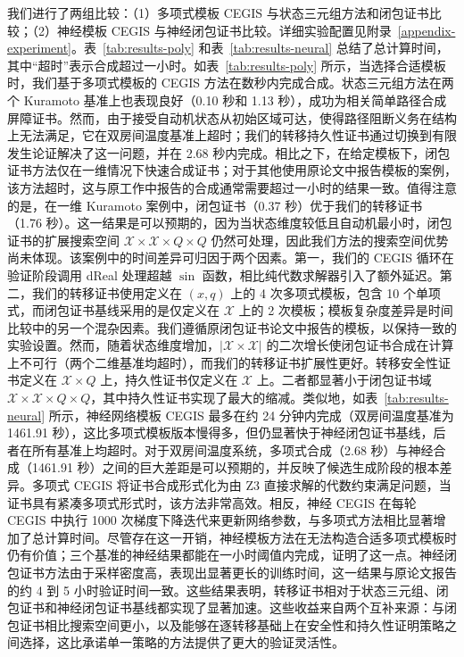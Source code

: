我们进行了两组比较：（1）多项式模板 CEGIS 与状态三元组方法和闭包证书比较；（2）神经模板 CEGIS 与神经闭包证书比较。详细实验配置见附录~\ref{appendix-experiment}。表~\ref{tab:results-poly} 和表~\ref{tab:results-neural} 总结了总计算时间，其中“超时”表示合成超过一小时。如表~\ref{tab:results-poly} 所示，当选择合适模板时，我们基于多项式模板的 CEGIS 方法在数秒内完成合成。状态三元组方法在两个 Kuramoto 基准上也表现良好（0.10 秒和 1.13 秒），成功为相关简单路径合成屏障证书。然而，由于接受自动机状态从初始区域可达，使得路径阻断义务在结构上无法满足，它在双房间温度基准上超时；我们的转移持久性证书通过切换到有限发生论证解决了这一问题，并在 2.68 秒内完成。相比之下，在给定模板下，闭包证书方法仅在一维情况下快速合成证书；对于其他使用原论文中报告模板的案例，该方法超时，这与原工作中报告的合成通常需要超过一小时的结果一致。值得注意的是，在一维 Kuramoto 案例中，闭包证书（0.37 秒）优于我们的转移证书（1.76 秒）。这一结果是可以预期的，因为当状态维度较低且自动机最小时，闭包证书的扩展搜索空间 $\mathcal{X} \times \mathcal{X} \times Q \times Q$ 仍然可处理，因此我们方法的搜索空间优势尚未体现。该案例中的时间差异可归因于两个因素。第一，我们的 CEGIS 循环在验证阶段调用 dReal 处理超越 $\sin$ 函数，相比纯代数求解器引入了额外延迟。第二，我们的转移证书使用定义在 $(x, q)$ 上的 4 次多项式模板，包含 10 个单项式，而闭包证书基线采用的是仅定义在 $\mathcal{X}$ 上的 2 次模板；模板复杂度差异是时间比较中的另一个混杂因素。我们遵循原闭包证书论文中报告的模板，以保持一致的实验设置。然而，随着状态维度增加，$|\mathcal{X} \times \mathcal{X}|$ 的二次增长使闭包证书合成在计算上不可行（两个二维基准均超时），而我们的转移证书扩展性更好。转移安全性证书定义在 $\mathcal{X} \times Q$ 上，持久性证书仅定义在 $\mathcal{X}$ 上。二者都显著小于闭包证书域 $\mathcal{X} \times \mathcal{X} \times Q \times Q$，其中持久性证书实现了最大的缩减。类似地，如表~\ref{tab:results-neural} 所示，神经网络模板 CEGIS 最多在约 24 分钟内完成（双房间温度基准为 1461.91 秒），这比多项式模板版本慢得多，但仍显著快于神经闭包证书基线，后者在所有基准上均超时。对于双房间温度系统，多项式合成（2.68 秒）与神经合成（1461.91 秒）之间的巨大差距是可以预期的，并反映了候选生成阶段的根本差异。多项式 CEGIS 将证书合成形式化为由 Z3 直接求解的代数约束满足问题，当证书具有紧凑多项式形式时，该方法非常高效。相反，神经 CEGIS 在每轮 CEGIS 中执行 1000 次梯度下降迭代来更新网络参数，与多项式方法相比显著增加了总计算时间。尽管存在这一开销，神经模板方法在无法构造合适多项式模板时仍有价值；三个基准的神经结果都能在一小时阈值内完成，证明了这一点。神经闭包证书方法由于采样密度高，表现出显著更长的训练时间，这一结果与原论文报告的约 4 到 5 小时验证时间一致。这些结果表明，转移证书相对于状态三元组、闭包证书和神经闭包证书基线都实现了显著加速。这些收益来自两个互补来源：与闭包证书相比搜索空间更小，以及能够在逐转移基础上在安全性和持久性证明策略之间选择，这比承诺单一策略的方法提供了更大的验证灵活性。

